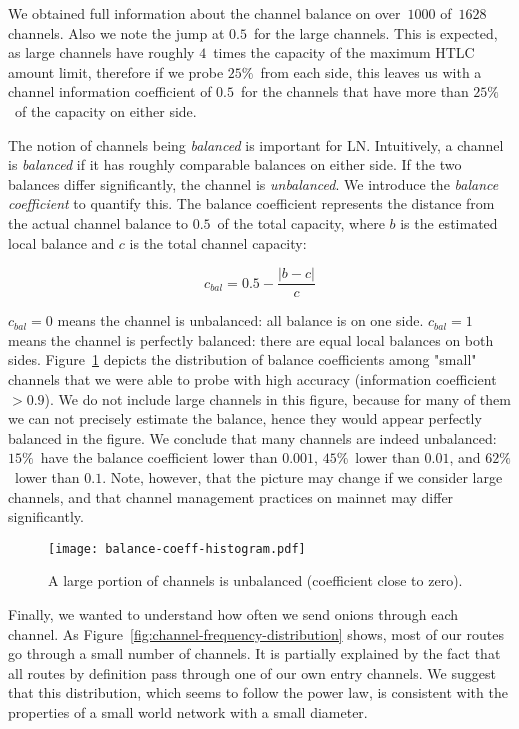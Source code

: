 We obtained full information about the channel balance on over~$1000$ of~$1628$ channels.
Also we note the jump at $0.5$~for the large channels.
This is expected, as large channels have roughly $4$~times the capacity of the maximum HTLC amount limit, therefore if we probe $25\%$~from each side, this leaves us with a channel information coefficient of $0.5$~for the channels that have more than $25\%$~of the capacity on either side.

The notion of channels being \textit{balanced} is important for LN.
Intuitively, a channel is \textit{balanced} if it has roughly comparable balances on either side.
If the two balances differ significantly, the channel is \textit{unbalanced}.
We introduce the \textit{balance coefficient} to quantify this.
The balance coefficient represents the distance from the actual channel balance to $0.5$~of the total capacity, where $b$ is the estimated local balance and $c$ is the total channel capacity:

\[c_{bal} = 0.5 - \frac{|b-c|}{c} \]

$c_{bal} = 0$ means the channel is unbalanced: all balance is on one side.
$c_{bal} = 1$ means the channel is perfectly balanced: there are equal local balances on both sides.
Figure~\ref{fig:balance-coeff-histogram} depicts the distribution of balance coefficients among "small" channels that we were able to probe with high accuracy (information coefficient $> 0.9$).
We do not include large channels in this figure, because for many of them we can not precisely estimate the balance, hence they would appear perfectly balanced in the figure.
We conclude that many channels are indeed unbalanced: $15\%$~have the balance coefficient lower than $0.001$, $45\%$~lower than $0.01$, and $62\%$~lower than $0.1$.
Note, however, that the picture may change if we consider large channels, and that channel management practices on mainnet may differ significantly.

\begin{figure}[]
	\centering
	\texttt{[image: balance-coeff-histogram.pdf]}
	\caption{A large portion of channels is unbalanced (coefficient close to zero).}
	\label{fig:balance-coeff-histogram}
\end{figure}

Finally, we wanted to understand how often we send onions through each channel.
As Figure~\ref{fig:channel-frequency-distribution} shows, most of our routes go through a small number of channels.
It is partially explained by the fact that all routes by definition pass through one of our own entry channels.
We suggest that this distribution, which seems to follow the power law, is consistent with the properties of a small world network with a small diameter.

